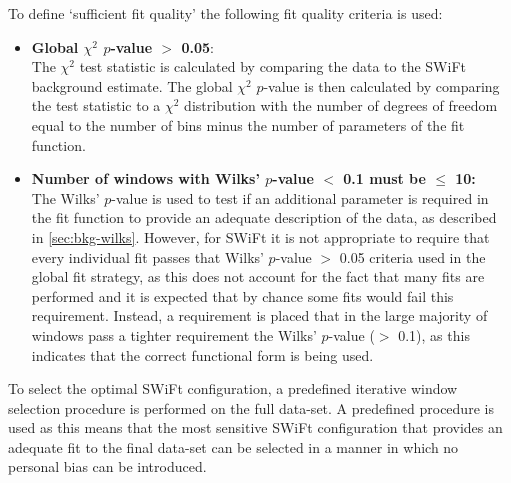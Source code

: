 \noindent
To define `sufficient fit quality' the following fit quality criteria is used:
\begin{itemize}[leftmargin=*]
  
\item \textbf{Global $\chi^{2}$ \mbox{$p$-value} $>$ 0.05}:\\
  The $\chi^{2}$ test statistic is calculated by comparing the data to the SWiFt background estimate.
  The global $\chi^{2}$ \mbox{$p$-value} is then calculated by comparing the test statistic
  to a $\chi^{2}$ distribution with the number of degrees of freedom equal to the number of bins
  minus the number of parameters of the fit function.\vspace{0.5em}
\item \textbf{Number of windows with Wilks' \mbox{$p$-value} $<$ 0.1 must be $\leq$ 10:}\\
  The Wilks' \mbox{$p$-value} is used to test if an additional parameter is required in the fit function
  to provide an adequate description of the data, as described in \ref{sec:bkg-wilks}. 
  However, for SWiFt it is not appropriate to require that every individual fit passes that Wilks' $p$-value $>$ 0.05 criteria used in the global fit strategy,
  as this does not account for the fact that many fits are performed and it is expected that by chance some fits would fail this requirement.
  Instead, a requirement is placed that in the large majority of windows pass a tighter requirement the Wilks' $p$-value ($>$ 0.1),
  as this indicates that the correct functional form is being used.
\end{itemize}

To select the optimal SWiFt configuration, a predefined iterative window selection procedure is performed on the full \lm{} data-set.
A predefined procedure is used as this means that the most sensitive SWiFt configuration that provides an adequate fit to the final data-set can be selected
in a manner in which no personal bias can be introduced.




